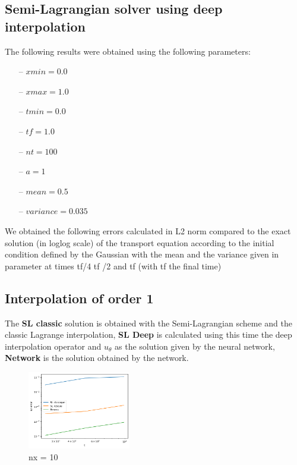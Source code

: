 \documentclass{article}
\begin{document}


\subsection{Semi-Lagrangian solver using deep interpolation}

The following results were obtained using the following parameters:

\begin{itemize}
    \item[--]$xmin = 0.0$
    \item[--] $xmax = 1.0$
    \item[--] $tmin = 0.0$
    \item[--] $tf = 1.0$
    \item[--] $nt = 100$
    \item[--] $a = 1$
    \item[--] $mean = 0.5$
    \item[--] $variance = 0.035$
\end{itemize}

We obtained the following errors calculated in L2 norm compared to the exact solution (in loglog scale) of the transport equation according to the initial condition defined by the Gaussian with the mean and the variance given in parameter at times tf/4 tf /2 and tf (with tf the final time)

\subsection{Interpolation of order 1}

The \textbf{SL classic} solution is obtained with the Semi-Lagrangian scheme and the classic Lagrange interpolation, \textbf{SL Deep} is calculated using this time the deep interpolation operator and $u_\theta $ as the solution given by the neural network, \textbf{Network} is the solution obtained by the network.\\

\begin{figure}[!h]
    \centering
    \includegraphics[width=0.4\textwidth]{images/i110.png}
    \caption{nx = 10}
\end{figure}
\end{document}
